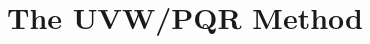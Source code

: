 \documentclass{subfile}
\begin{document}
	\section{The UVW/PQR Method}\label{sec:uvw}
	\textcite{rozenberg_2011}
\end{document}

